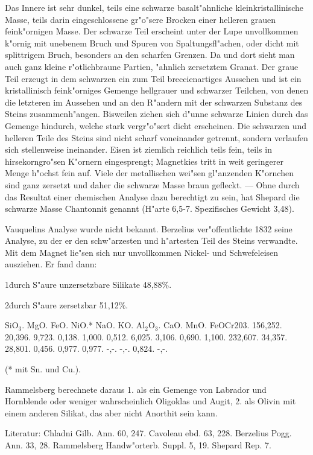 \documentclass[a4paper, 11pt, oneside]{article}
\begin{document}
Das Innere ist sehr dunkel, teils eine schwarze basalt"ahnliche kleinkristallinische Masse, teils darin eingeschlossene gr"o"sere Brocken einer helleren grauen feink"ornigen Masse. Der schwarze Teil erscheint unter der Lupe unvollkommen k"ornig mit unebenem Bruch und Spuren von Spaltungsfl"achen, oder dicht mit splittrigem Bruch, besonders an den scharfen Grenzen. Da und dort sieht man auch ganz kleine r"otlichbraune Partien, "ahnlich zersetztem Granat. Der graue Teil erzeugt in dem schwarzen ein zum Teil breccienartiges Aussehen und ist ein kristallinisch feink"orniges Gemenge hellgrauer und schwarzer Teilchen, von denen die letzteren im Aussehen und an den R"andern mit der schwarzen Substanz des Steins zusammenh"angen. Bisweilen ziehen sich d"unne schwarze Linien durch das Gemenge hindurch, welche stark vergr"o"sert dicht erscheinen. Die schwarzen und helleren Teile des Steins sind nicht scharf voneinander getrennt, sondern verlaufen sich stellenweise ineinander. Eisen ist ziemlich reichlich teils fein, teils in hirsekorngro"sen K"ornern eingesprengt; Magnetkies tritt in weit geringerer Menge h"ochst fein auf. Viele der metallischen wei"sen gl"anzenden K"ornchen sind ganz zersetzt und daher die schwarze Masse braun gefleckt. --- Ohne durch das Resultat einer chemischen Analyse dazu berechtigt zu sein, hat Shepard die schwarze Masse Chantonnit genannt (H"arte 6,5-7. Spezifisches Gewicht 3,48).

Vauquelins Analyse wurde nicht bekannt. Berzelius ver"offentlichte 1832 seine Analyse, zu der er den schw"arzesten und h"artesten Teil des Steins verwandte. Mit dem Magnet lie"sen sich nur unvollkommen Nickel- und Schwefeleisen ausziehen. Er fand dann:

1\. durch S"aure unzersetzbare Silikate 48,88\%.

2\. durch S"aure zersetzbar 51,12\%.

SiO$_{3}$. MgO. FeO. NiO.* NaO. KO. Al$_{2}$O$_{3}$. CaO. MnO. FeOCr203.  
1\. 56,252. 20,396. 9,723. 0,138. 1,000. 0,512. 6,025. 3,106. 0,690. 1,100.  
2\. 32,607. 34,357. 28,801. 0,456. 0,977. 0,977. -,-. -,-. 0,824. -,-.

(* mit Sn. und Cu.).

Rammelsberg berechnete daraus 1. als ein Gemenge von Labrador und Hornblende oder weniger wahrscheinlich Oligoklas und Augit, 2. als Olivin mit einem anderen Silikat, das aber nicht Anorthit sein kann.

Literatur: Chladni Gilb. Ann. 60, 247. Cavoleau ebd. 63, 228. Berzelius Pogg. Ann. 33, 28. Rammelsberg Handw"orterb. Suppl. 5, 19. Shepard Rep. 7.
\end{document}
